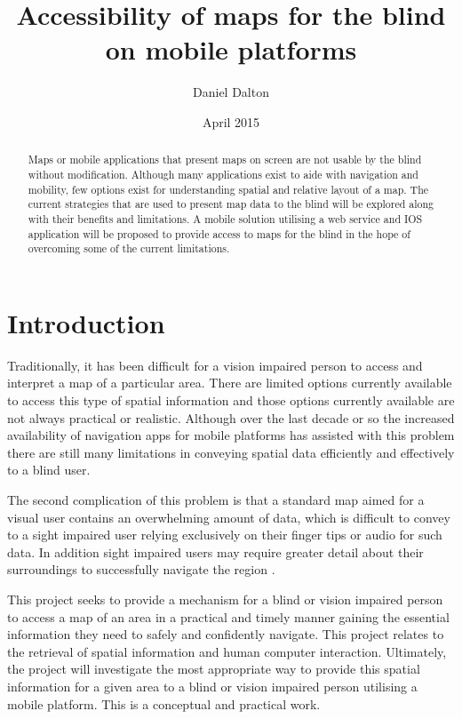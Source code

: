 \documentclass[11pt,twoside,a4paper]{article}
\begin{document}
\title{Accessibility of maps for the blind on mobile platforms}
\author{Daniel Dalton}
\date{April 2015}
\maketitle
\tableofcontents

\begin{abstract}
Maps or mobile applications that present maps on screen are not usable
by the blind without modification. Although many applications exist to
aide with navigation and mobility, few options exist for understanding
spatial and relative layout of a map.
The current strategies that are used
to present map data to the blind will be explored along with
their benefits and limitations. A mobile solution utilising a web
service and IOS application will be proposed to provide access to maps
for the blind in the hope of overcoming some of the current limitations.
\end{abstract}

\section{Introduction}
Traditionally, it has been difficult for a vision impaired person to
access and interpret a map of a particular area. There are limited
options currently available to access this type of spatial information
and those options currently available are not always practical or
realistic. Although over the last decade or so the increased
availability of navigation apps for mobile platforms has assisted with
this problem there are still many limitations in conveying spatial data
efficiently and effectively to a blind user.

The second complication of this problem is that a standard map aimed for
a visual user contains an overwhelming amount of data, which is
difficult to convey to a sight impaired user relying exclusively on
their finger tips or audio for such data. In addition sight impaired
users may require greater detail about their surroundings to
successfully navigate the region \cite{Haptimap2012}.

This project seeks to provide a mechanism for a blind or vision impaired
person to access a map of an area in a practical and timely manner
gaining the essential information they need to safely and confidently
navigate. This project relates to the retrieval of spatial information and human
computer interaction. Ultimately, the project will investigate the most
appropriate way to provide this spatial information for a given area to
a blind or vision impaired person utilising a mobile platform. This is a
conceptual and practical work.
\end{document}
